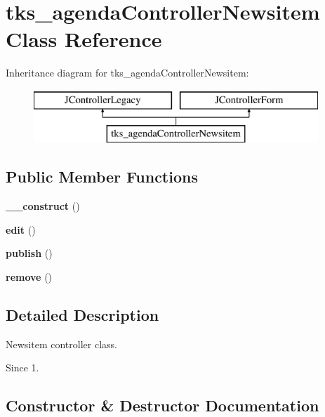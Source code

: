\section{tks\+\_\+agenda\+Controller\+Newsitem Class Reference}
\label{classtks__agenda_controller_newsitem}
Inheritance diagram for tks\+\_\+agenda\+Controller\+Newsitem\+:\begin{figure}[H]
\begin{center}
\leavevmode
\includegraphics[height=2.000000cm]{classtks__agenda_controller_newsitem}
\end{center}
\end{figure}
\subsection*{Public Member Functions}
\begin{DoxyCompactItemize}
\item 
\textbf{ \+\_\+\+\_\+construct} ()
\item 
\textbf{ edit} ()
\item 
\textbf{ publish} ()
\item 
\textbf{ remove} ()
\end{DoxyCompactItemize}


\subsection{Detailed Description}
Newsitem controller class.

\begin{DoxySince}{Since}
1. 
\end{DoxySince}


\subsection{Constructor \& Destructor Documentation}
\mbox{\label{classtks__agenda_controller_newsitem_a095c5d389db211932136b53f25f39685}} 
